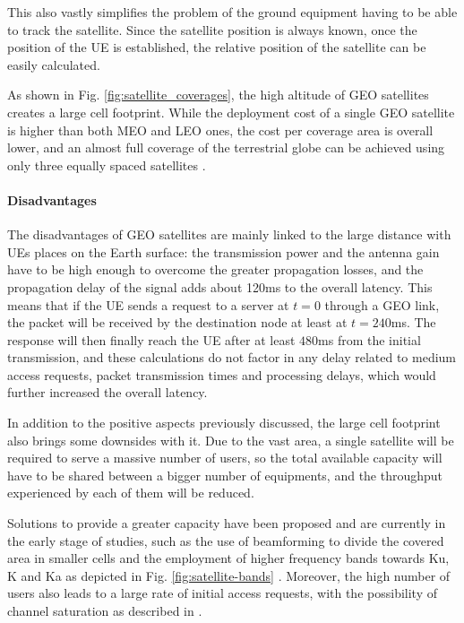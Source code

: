 This also vastly simplifies the problem of the ground equipment having to be able to track the satellite. Since the satellite position is always known, once the position of the \ac{UE} is established, the relative position of the satellite can be easily calculated.

As shown in Fig. \ref{fig:satellite_coverages}, the high altitude of \ac{GEO} satellites creates a large cell footprint. While the deployment cost of a single \ac{GEO} satellite is higher than both \ac{MEO} and \ac{LEO} ones, the cost per coverage area is overall lower, and an almost full coverage of the terrestrial globe can be achieved using only three equally spaced satellites \cite{types-of-orbits-esa}.

\paragraph{Disadvantages}
The disadvantages of \ac{GEO} satellites are mainly linked to the large distance with \ac{UE}s places on the Earth surface: the transmission power and the antenna gain have to be high enough to overcome the greater propagation losses, and the propagation delay of the signal adds about 120ms to the overall latency. This means that if the \ac{UE} sends a request to a server at $t=0$ through a \ac{GEO} link, the packet will be received by the destination node at least at $t=240$ms. The response will then finally reach the \ac{UE} after at least $480$ms from the initial transmission, and these calculations do not factor in any delay related to medium access requests, packet transmission times and processing delays, which would further increased the overall latency.

In addition to the positive aspects previously discussed, the large cell footprint also brings some downsides with it. Due to the vast area, a single satellite will be required to serve a massive number of users, so the total available capacity will have to be shared between a bigger number of equipments, and the throughput experienced by each of them will be reduced.

Solutions to provide a greater capacity have been proposed and are currently in the early stage of studies, such as the use of beamforming to divide the covered area in smaller cells and the employment of higher frequency bands towards Ku, K and Ka as depicted in Fig. \ref{fig:satellite-bands} \cite{advances-comm-sat-sys}.
Moreover, the high number of users also leads to a large rate of initial access requests, with the possibility of channel saturation as described in \cite{3gpp-tr-38.811}.

